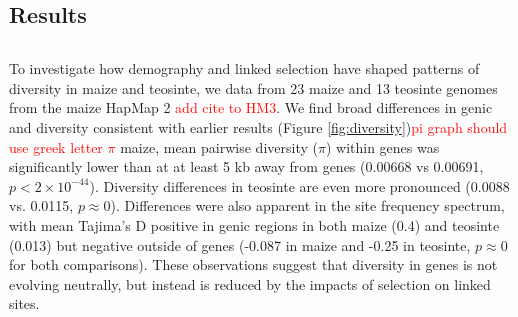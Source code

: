 \documentclass{pnastwo}
\newcommand{\jri}[1]{\textcolor{red}{\scriptsize #1}}
\begin{document}
\begin{article}
\section{Results}
\DIFdelbegin \subsection{}
\addtocounter{subsection}{-1}\DIFdelend To investigate how demography and linked selection have shaped patterns of diversity in maize and teosinte, we \DIFdelbegin {}\DIFdelend \DIFaddbegin {}\DIFaddend data from 23 maize and 13 teosinte genomes from the maize HapMap 2 \DIFdelbegin {}\DIFdelend \DIFaddbegin {}\jri{add cite to HM3}\DIFaddend .
We find broad differences in genic and \DIFdelbegin {}\DIFdelend \DIFaddbegin {}\DIFaddend diversity consistent with earlier results  \cite{hufford2012}(Figure \ref{fig:diversity})\DIFdelbegin {}\DIFdelend \DIFaddbegin \DIFadd{:  }\jri{pi graph should use greek letter $\pi$} \DIFaddend maize, mean pairwise diversity ($\pi$) within genes was significantly lower than at \DIFdelbegin {}\DIFdelend \DIFaddbegin {}\DIFaddend at least 5 kb away from genes (0.00668 vs 0.00691, $p<2\times 10^{-44}$). 
Diversity differences in teosinte are even more pronounced (0.0088 vs. 0.0115, $p\approx 0$). 
Differences were also apparent in the site frequency spectrum, with mean Tajima's D positive in genic regions in both maize (0.4) and teosinte (0.013) but negative outside of genes (-0.087 in maize and -0.25 in teosinte, $p\approx 0$ for both comparisons).
These observations suggest that diversity in genes is not evolving neutrally, but instead is reduced by the impacts of selection on linked sites. 


\end{article}
\end{document}

